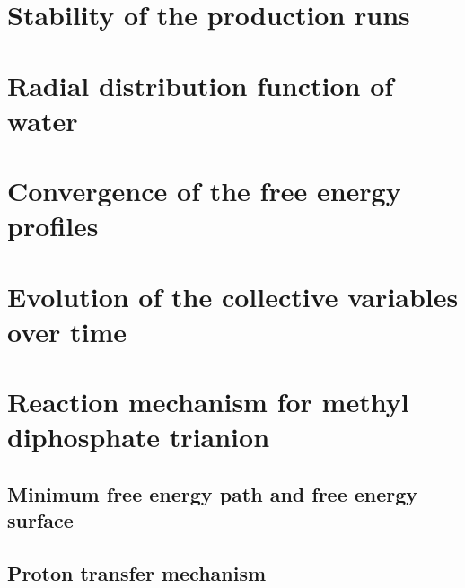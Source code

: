 
\section{Stability of the production runs}




\section{Radial distribution function of water}




\section{Convergence of the free energy profiles}




\section{Evolution of the collective variables over time}





\section{Reaction mechanism for methyl diphosphate trianion}
\subsection{Minimum free energy path and free energy surface}
\subsection{Proton transfer mechanism}





